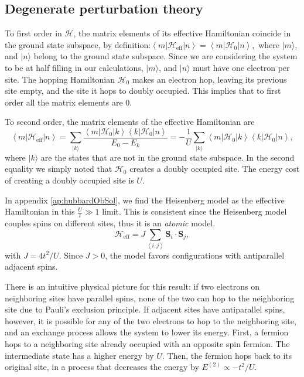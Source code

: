\subsection{Degenerate perturbation theory}

To first order in $\mathcal{H}$, the matrix elements of its effective Hamiltonian coincide in the ground state subspace, by definition:$
\left\langle m | \mathcal{H}_{\text{eff}} | n \right\rangle = \left\langle m | \mathcal{H}_0 | n \right\rangle ,
$ 
where $| m \rangle$, and $| n \rangle$ belong to the ground state subspace.
Since we are considering the system to be at half filling in our calculations, $| m\rangle$, and $| n \rangle$ must have one electron per site.
The hopping Hamiltonian $\mathcal{H}_0$ makes an electron hop, leaving its previous site empty, and the site it hops to doubly occupied.
This implies that to first order all the matrix elements are 0.

To second order, the matrix elements of the effective Hamiltonian are
\begin{equation}
\left \langle m | \mathcal{H}_{\text{eff}} | n \right\rangle = \sum_{ | k \rangle} \frac{\left\langle m | \mathcal{H}_0 | k \right\rangle \left\langle k | \mathcal{H}_0 | n \right\rangle }{E_0 - E_k} =-\frac{1}{U} \sum_{ | k \rangle} \left\langle m | \mathcal{H}_0 | k \right\rangle \left\langle k | \mathcal{H}_0 | n \right\rangle ,
\end{equation}
where $| k \rangle$ are the states that are not in the ground state subspace.
In the second equality we simply noted that $\mathcal{H}_0$ creates a doubly occupied site.
The energy cost of creating a doubly occupied site is $U$. 

In appendix \ref{ap:hubbardObSol}, we find the Heisenberg model as the effective Hamiltonian in this $\frac{U}{t} \gg 1$ limit.
This is consistent since the Heisenberg model couples spins on different sites, thus it is an \emph{atomic} model.
\begin{equation}
\mathcal{H}_{\text{eff}} = J \sum_{\left\langle i, j \right\rangle} \bm S_i \cdot \bm S_j ,
\end{equation}
with $J = 4 t^2 / U$.
Since $J > 0$, the model favors configurations with antiparallel adjacent spins.

There is an intuitive physical picture for this result: if two electrons on neighboring sites have parallel spins, none of the two can hop to the neighboring site due to Pauli's exclusion principle.
If adjacent sites have antiparallel spins, however, it is possible for any of the two electrons to hop to the neighboring site, and an exchange process allows the system to lower its energy.
First, a fermion hops to a neighboring site already occupied with an opposite spin fermion.
The intermediate state has a higher energy by $U$.
Then, the fermion hops back to its original site, in a process that decreases the energy by $E^{(2)} \propto - t^2 / U$.
